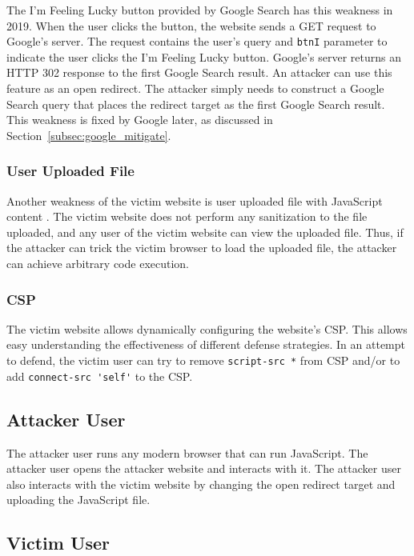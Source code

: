 \documentclass[conference]{IEEEtran}
\begin{document}
The I'm Feeling Lucky button provided by Google Search has this weakness in 2019. When the user clicks the button, the website sends a GET request to Google's server. The request contains the user's query and \lstinline{btnI} parameter to indicate the user clicks the I'm Feeling Lucky button. Google's server returns an HTTP 302 response to the first Google Search result. An attacker can use this feature as an open redirect. The attacker simply needs to construct a Google Search query that places the redirect target as the first Google Search result. This weakness is fixed by Google later, as discussed in Section~\ref{subsec:google_mitigate}.

\subsubsection{User Uploaded File}

Another weakness of the victim website is user uploaded file with JavaScript content \cite{cwe_upload_file}. The victim website does not perform any sanitization to the file uploaded, and any user of the victim website can view the uploaded file. Thus, if the attacker can trick the victim browser to load the uploaded file, the attacker can achieve arbitrary code execution.

\subsubsection{CSP}

The victim website allows dynamically configuring the website's CSP. This allows easy understanding the effectiveness of different defense strategies. In an attempt to defend, the victim user can try to remove \lstinline{script-src *} from CSP and/or to add \lstinline{connect-src 'self'} to the CSP.

\subsection{Attacker User}

The attacker user runs any modern browser that can run JavaScript. The attacker user opens the attacker website and interacts with it. The attacker user also interacts with the victim website by changing the open redirect target and uploading the JavaScript file.

\subsection{Victim User}
\end{document}
